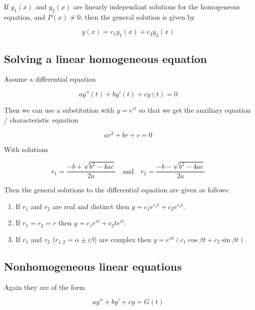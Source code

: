 \documentclass[a4paper]{article}
\begin{document}
If $y_1(x)$ and $y_2(x)$ are linearly independant solutions for the homogeneous equation, and $P(x)\not=0$, then the general solution is given by

\begin{equation}
    y(x)=c_1y_1(x)+c_2y_2(x)
\end{equation}

\subsection{Solving a linear homogeneous equation}

Assume a differential equation

\begin{equation}
    ay''(t)+by'(t)+cy(t)=0
\end{equation}

Then we can use a substitution with $y=e^{rt}$ so that we get the auxiliary equation / characteristic equation

\begin{equation}
    ar^2+br+c=0
\end{equation}

With solutions

\begin{equation}
    r_1=\frac{-b+\sqrt{b^2-4ac}}{2a}\quad\text{and}\quad r_2=\frac{-b-\sqrt{b^2-4ac}}{2a}
\end{equation}

Then the general solutions to the differential equation are given as follows:

\begin{enumerate}
    \item If $r_1$ and $r_2$ are real and distinct then $y=c_1e^{r_1t}+c_2e^{r_2t}$.
    \item If $r_1=r_2=r$ then $y=c_1e^{rt}+c_2te^{rt}$.
    \item If $r_1$ and $r_2$ ($r_{1,2}=\alpha\pm i\beta$) are complex then $y=e^{\alpha t}(c_1\cos\beta t + c_2\sin \beta t)$.
\end{enumerate}

\subsection{Nonhomogeneous linear equations}

Again they are of the form

\begin{equation}
    ay''+by'+cy=G(t)    
\end{equation}
\end{document}
